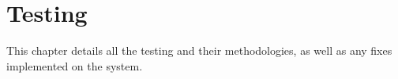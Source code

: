 
\chapter{Testing}\label{chapter:methodology}

This chapter details all the testing and their methodologies, as well as any
fixes implemented on the system.

\clearpage

\clearpage

\clearpage


